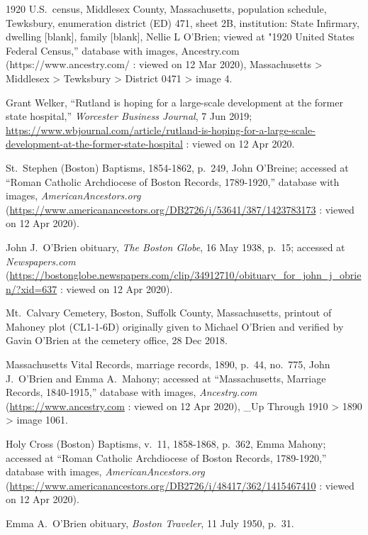 \begin{thebibliography}{99}
	1920 U.S.\ census, Middlesex County, Massachusetts, population schedule, Tewksbury, enumeration district (ED) 471, sheet 2B, institution: State Infirmary, dwelling [blank], family [blank], Nellie L O'Brien; viewed at "1920 United States Federal Census,” database with images, Ancestry.com (https://www.ancestry.com/ : viewed on 12 Mar 2020), Massachusetts > Middlesex > Tewksbury > District 0471 > image 4.
	
	Grant Welker, ``Rutland is hoping for a large-scale development at the former state hospital,'' \textit{Worcester Business Journal}, 7 Jun 2019;  \url{https://www.wbjournal.com/article/rutland-is-hoping-for-a-large-scale-development-at-the-former-state-hospital} : viewed on 12 Apr 2020.
	
	St.\ Stephen (Boston) Baptisms, 1854-1862, p.\ 249, John O'Breine; accessed at ``Roman Catholic Archdiocese of Boston Records, 1789-1920,'' database with images, \textit{AmericanAncestors.org} (\url{https://www.americanancestors.org/DB2726/i/53641/387/1423783173} : viewed on 12 Apr 2020).
	
	John J.\ O'Brien obituary, \textit{The Boston Globe}, 16 May 1938, p.\ 15; accessed at \textit{Newspapers.com} (\url{https://bostonglobe.newspapers.com/clip/34912710/obituary_for_john_j_obrien/?xid=637} : viewed on 12 Apr 2020).
	
	Mt.\ Calvary Cemetery, Boston, Suffolk County, Massachusetts, printout of Mahoney plot (CL1-1-6D) originally given to Michael O'Brien and verified by Gavin O'Brien at the cemetery office, 28 Dec 2018.
	
	Massachusetts Vital Records, marriage records, 1890, p.\ 44, no.\ 775, John J.\ O'Brien and Emma A.\ Mahony; accessed at ``Massachusetts, Marriage Records, 1840-1915,'' database with images, \textit{Ancestry.com} (\url{https://www.ancestry.com} : viewed on 12 Apr 2020), \_Up Through 1910 > 1890 > image 1061.
	
	Holy Cross (Boston) Baptisms, v.\ 11, 1858-1868, p.\ 362, Emma Mahony; accessed at ``Roman Catholic Archdiocese of Boston Records, 1789-1920,'' database with images, \textit{AmericanAncestors.org} (\url{https://www.americanancestors.org/DB2726/i/48417/362/1415467410} : viewed on 12 Apr 2020).
	
	Emma A.\ O'Brien obituary, \textit{Boston Traveler}, 11 July 1950, p.\ 31.
	

\end{thebibliography}

